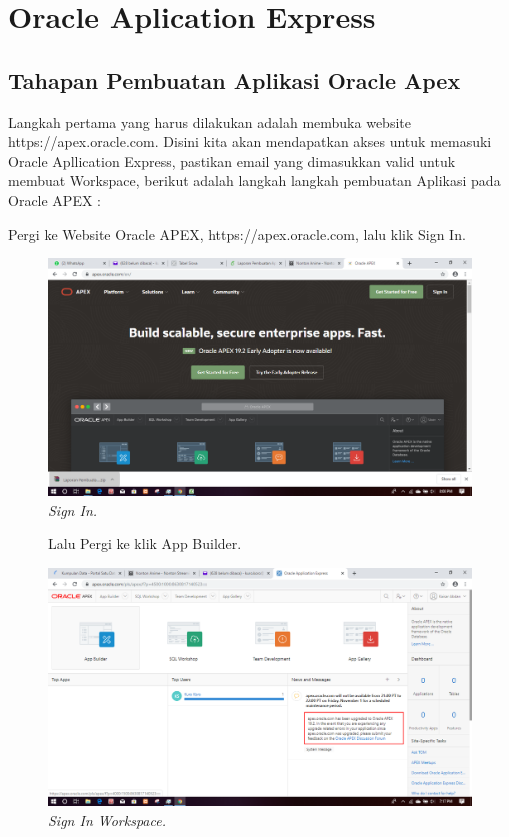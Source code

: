 \chapter{Oracle Aplication Express}

\section{Tahapan Pembuatan Aplikasi Oracle Apex}
Langkah pertama yang harus dilakukan adalah membuka website https://apex.oracle.com\cite{OracleApex}. Disini kita akan mendapatkan akses untuk memasuki Oracle Apllication Express, pastikan email yang dimasukkan valid untuk membuat Workspace, berikut adalah langkah langkah pembuatan Aplikasi pada Oracle APEX :

\begin{enumerate}
\item[1]Pergi ke Website Oracle APEX, https://apex.oracle.com, lalu klik Sign In.

\begin{figure}[!htbp]
    \begin{center}
    \includegraphics[scale=0.2]{figures/1.png}
    \caption{\textit{Sign In.}}
    \end{center}   
    \end{figure}
    
\begin{figure}[!htbp]
\item[2]Lalu Pergi ke klik App Builder.

    \begin{center}
    \includegraphics[scale=0.2]{figures/2.png}
    \caption{\textit{Sign In Workspace.}}
    \end{center}



\end{figure}
\end{enumerate}
